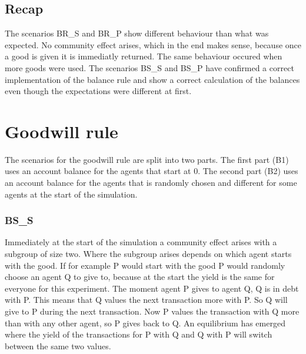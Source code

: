\documentclass[twoside,openright]{uva-bachelor-thesis}
\begin{document}
\subsection{Recap}
 The scenarios BR\_S and BR\_P show different behaviour than what was expected. No community effect arises, which in the end makes sense, because once a good is given it is immediatly returned. The same behaviour occured when more goods were used. The scenarios BS\_S and BS\_P have confirmed a correct implementation of the balance rule and show a correct calculation of the balances even though the expectations were different at first.


\section{Goodwill rule}
 The scenarios for the goodwill rule are split into two parts. The first part (B1) uses an account balance for the agents that start at 0. The second part (B2) uses an account balance for the agents that is randomly chosen and different for some agents at the start of the simulation. 
\subsubsection{BS\_S}
Immediately at the start of the simulation a community effect arises with a subgroup of size two. Where the subgroup arises depends on which agent starts with the good. If for example P would start with the good P would randomly choose an agent Q to give to, because at the start the yield is the same for everyone for this experiment. The moment agent P gives to agent Q, Q is in debt with P. This means that Q values the next transaction more with P. So Q will give to P during the next transaction. Now P values the transaction with Q more than with any other agent, so P gives back to Q. An equilibrium has emerged where the yield of the transactions for P with Q and Q with P will switch between the same two values.  
\end{document}
